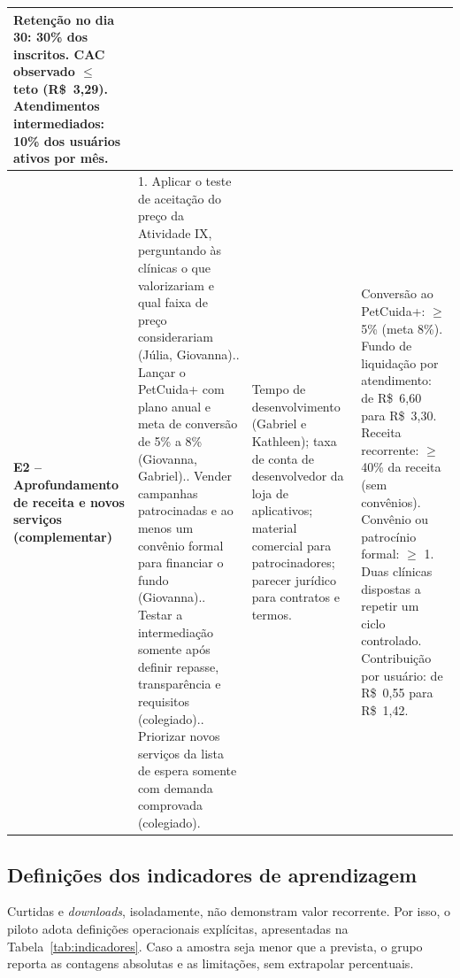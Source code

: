 \begin{table}[htb]
\begin{tabularx}{\textwidth}{L{2.2cm} L{4.1cm} L{3.6cm} Y}
Retenção no dia 30: 30\% dos inscritos.\newline
CAC observado $\le$ teto (R\$~3,29).\newline
Atendimentos intermediados: 10\% dos usuários ativos por mês.\\
\midrule
\textbf{E2 -- Aprofundamento de receita e novos serviços (complementar)} &
1. Aplicar o teste de aceitação do preço da Atividade IX, perguntando às clínicas o que valorizariam e qual faixa de preço considerariam (Júlia, Giovanna).. Lançar o PetCuida+ com plano anual e meta de conversão de 5\% a 8\% (Giovanna, Gabriel).. Vender campanhas patrocinadas e ao menos um convênio formal para financiar o fundo (Giovanna).. Testar a intermediação somente após definir repasse, transparência e requisitos (colegiado).. Priorizar novos serviços da lista de espera somente com demanda comprovada (colegiado). &
Tempo de desenvolvimento (Gabriel e Kathleen); taxa de conta de desenvolvedor da loja de aplicativos; material comercial para patrocinadores; parecer jurídico para contratos e termos. &
Conversão ao PetCuida+: $\ge$ 5\% (meta 8\%).\newline
Fundo de liquidação por atendimento: de R\$~6,60 para R\$~3,30.\newline
Receita recorrente: $\ge$ 40\% da receita (sem convênios).\newline
Convênio ou patrocínio formal: $\ge$ 1.\newline
Duas clínicas dispostas a repetir um ciclo controlado.\newline
Contribuição por usuário: de R\$~0,55 para R\$~1,42.\\
\bottomrule
\end{tabularx}
\fonteautores
\end{table}

\subsection{Definições dos indicadores de aprendizagem}

Curtidas e \textit{downloads}, isoladamente, não demonstram valor recorrente. Por isso, o piloto adota definições operacionais explícitas, apresentadas na Tabela~\ref{tab:indicadores}. Caso a amostra seja menor que a prevista, o grupo reporta as contagens absolutas e as limitações, sem extrapolar percentuais.

